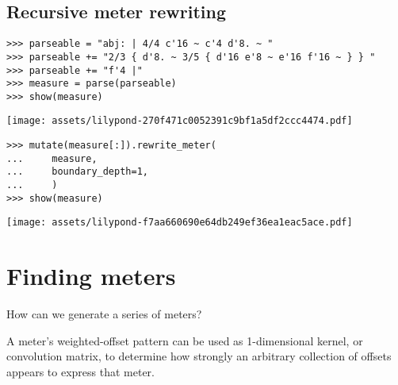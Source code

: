 \subsection{Recursive meter rewriting} %

\begin{comment}
<abjad>
parseable = "abj: | 4/4 c'16 ~ c'4 d'8. ~ "
parseable += "2/3 { d'8. ~ 3/5 { d'16 e'8 ~ e'16 f'16 ~ } } "
parseable += "f'4 |"
measure = parse(parseable)
show(measure)
</abjad>
\end{comment}

\begin{singlespacing}
\vspace{-0.5\baselineskip}
\begin{lstlisting}
>>> parseable = "abj: | 4/4 c'16 ~ c'4 d'8. ~ "
>>> parseable += "2/3 { d'8. ~ 3/5 { d'16 e'8 ~ e'16 f'16 ~ } } "
>>> parseable += "f'4 |"
>>> measure = parse(parseable)
>>> show(measure)
\end{lstlisting}
\noindent\texttt{[image: assets/lilypond-270f471c0052391c9bf1a5df2ccc4474.pdf]}
\end{singlespacing}

\begin{comment}
<abjad>
mutate(measure[:]).rewrite_meter(
    measure,
    boundary_depth=1,
    )
show(measure)
</abjad>
\end{comment}

\begin{singlespacing}
\vspace{-0.5\baselineskip}
\begin{lstlisting}
>>> mutate(measure[:]).rewrite_meter(
...     measure,
...     boundary_depth=1,
...     )
>>> show(measure)
\end{lstlisting}
\noindent\texttt{[image: assets/lilypond-f7aa660690e64db249ef36ea1eac5ace.pdf]}
\end{singlespacing}

\section{Finding meters}

How can we generate a series of meters?

A meter's weighted-offset pattern can be used as 1-dimensional kernel, or
convolution matrix, to determine how strongly an arbitrary collection of
offsets appears to express that meter.

